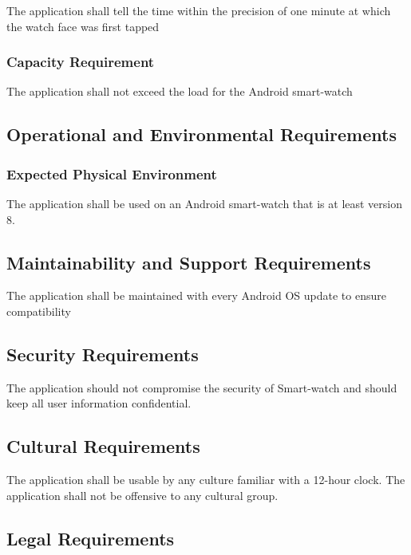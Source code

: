 \documentclass[12pt, titlepage]{article}
\begin{document}
The application shall tell the time within the precision of one minute at which the watch face was first tapped

\subsubsection{Capacity Requirement}

The application shall not exceed the load for the Android smart-watch %

\subsection{Operational and Environmental Requirements}

\subsubsection{Expected Physical Environment}

The application shall be used on an Android smart-watch that is at least version 8. %

\subsection{Maintainability and Support Requirements}

The application shall be maintained with every Android OS update to ensure compatibility %

\subsection{Security Requirements}

The application should not compromise the security of Smart-watch and should keep all user information confidential.

\subsection{Cultural Requirements}

The application shall be usable by any culture familiar with a 12-hour clock. The application shall not be offensive to any cultural group.

\subsection{Legal Requirements}
\end{document}
